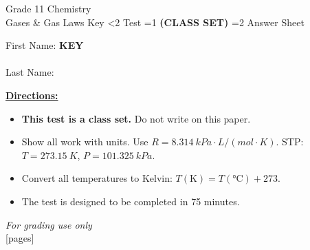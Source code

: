 \documentclass[addpoints]{exam}
\newcommand{\event}{Gases \& Gas Laws}
\newcommand{\tournament}{}
\def\type{0}
\begin{document}
\begin{center}
    {\huge Grade 11 Chemistry \\ \event
    \ifprintanswers \space Key
    \else \space \ifnum\type<2 Test \fi \ifnum\type=1 \textbf{(CLASS SET)} \fi
          \ifnum\type=2 Answer Sheet \fi
    \fi \\ \vspace{3mm}\tournament\vspace{1mm}}
\end{center}

\vspace{.25\textheight}

\begin{center}
    First Name: \ifprintanswers
    \underline{\hspace{3.5cm}}\textbf{KEY}\underline{\hspace{5.5cm}}\\\vspace{5mm}
    \else \underline{\hspace{10cm}}\\ \vspace{5mm} \fi
    Last Name: \underline{\hspace{10cm}}\\ \vspace{5mm}
\end{center}

\noindent\textbf{\underline{Directions:}}
\begin{itemize}
    \ifnum\type=1 \item \textbf{This test is a class set.} Do not write on this paper. \fi
    \item Show all work with units. Use $R = \SI{8.314}{kPa\cdot L/(mol\cdot K)}$.
    STP: $T = \SI{273.15}{K}$, $P = \SI{101.325}{kPa}$.
    \item Convert all temperatures to Kelvin: $T(\text{K}) = T(\si{\celsius}) + 273$.
    \item The test is designed to be completed in 75 minutes.
\end{itemize}
\begin{center}
\textit{For grading use only}\\
[pages]
\end{center}
\end{document}
